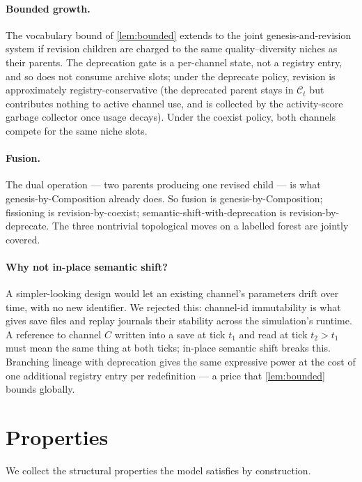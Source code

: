\documentclass[journal,onecolumn,11pt]{IEEEtran}
\theoremstyle{definition}
\begin{document}
\paragraph{Bounded growth.} The vocabulary bound of \cref{lem:bounded} extends to the joint genesis-and-revision system if revision children are charged to the same quality--diversity niches as their parents. The deprecation gate is a per-channel state, not a registry entry, and so does not consume archive slots; under the deprecate policy, revision is approximately registry-conservative (the deprecated parent stays in $\mathcal{C}_t$ but contributes nothing to active channel use, and is collected by the activity-score garbage collector once usage decays). Under the coexist policy, both channels compete for the same niche slots.

\paragraph{Fusion.} The dual operation --- two parents producing one revised child --- is what genesis-by-Composition already does. So fusion is genesis-by-Composition; fissioning is revision-by-coexist; semantic-shift-with-deprecation is revision-by-deprecate. The three nontrivial topological moves on a labelled forest are jointly covered.

\paragraph{Why not in-place semantic shift?} A simpler-looking design would let an existing channel's parameters drift over time, with no new identifier. We rejected this: channel-id immutability is what gives save files and replay journals their stability across the simulation's runtime. A reference to channel $C$ written into a save at tick $t_1$ and read at tick $t_2 > t_1$ must mean the same thing at both ticks; in-place semantic shift breaks this. Branching lineage with deprecation gives the same expressive power at the cost of one additional registry entry per redefinition --- a price that \cref{lem:bounded} bounds globally.

\section{Properties}
\label{sec:properties}

We collect the structural properties the model satisfies by construction.
\end{document}
